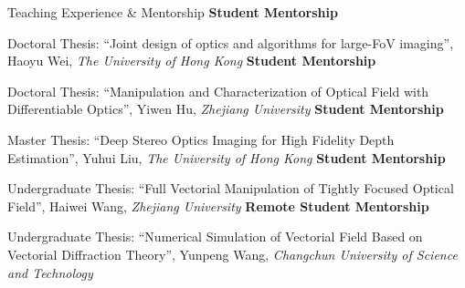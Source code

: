 \begin{rubric}{Teaching Experience \& Mentorship}
    \entry*[2022 -- 2025]%
    \textbf{Student Mentorship}
    \par Doctoral Thesis: ``Joint design of optics and algorithms for large-FoV imaging'', Haoyu Wei, \textit{The University of Hong Kong}
    \entry*[2021 -- 2024]%
    \textbf{Student Mentorship}
    \par Doctoral Thesis: ``Manipulation and Characterization of Optical Field with Differentiable Optics'', Yiwen Hu, \textit{Zhejiang University}
    \entry*[2023]%
    \textbf{Student Mentorship}
    \par Master Thesis: ``Deep Stereo Optics Imaging for High Fidelity Depth Estimation'', Yuhui Liu, \textit{The University of Hong Kong}
    \entry*[2022]%
    \textbf{Student Mentorship}
    \par Undergraduate Thesis: ``Full Vectorial Manipulation of Tightly Focused Optical Field'', Haiwei Wang, \textit{Zhejiang University}
    \entry*[2022]%
    \textbf{Remote Student Mentorship}
    \par Undergraduate Thesis: ``Numerical Simulation of Vectorial Field Based on Vectorial Diffraction Theory'', Yunpeng Wang, \textit{Changchun University of Science and Technology}
\end{rubric}